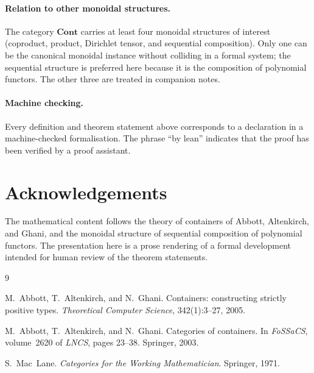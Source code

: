 \documentclass[11pt,a4paper]{article}
\theoremstyle{plain}
\theoremstyle{definition}
\newcommand{\Cont}{\mathbf{Cont}}
\begin{document}
\paragraph{Relation to other monoidal structures.}
The category $\Cont$ carries at least four monoidal structures of
interest (coproduct, product, Dirichlet tensor, and sequential
composition). Only one can be the canonical monoidal instance without
colliding in a formal system; the sequential structure is preferred here
because it is the composition of polynomial functors. The other three are
treated in companion notes.

\paragraph{Machine checking.}
Every definition and theorem statement above corresponds to a declaration
in a machine-checked formalisation. The phrase ``by lean'' indicates that
the proof has been verified by a proof assistant.

\section*{Acknowledgements}

The mathematical content follows the theory of containers of Abbott,
Altenkirch, and Ghani, and the monoidal structure of sequential
composition of polynomial functors. The presentation here is a prose
rendering of a formal development intended for human review of the
theorem statements.

\begin{thebibliography}{9}

M.~Abbott, T.~Altenkirch, and N.~Ghani.
\newblock Containers: constructing strictly positive types.
\newblock \emph{Theoretical Computer Science}, 342(1):3--27, 2005.

M.~Abbott, T.~Altenkirch, and N.~Ghani.
\newblock Categories of containers.
\newblock In \emph{FoSSaCS}, volume~2620 of \emph{LNCS}, pages 23--38.
\newblock Springer, 2003.

S.~Mac~Lane.
\newblock \emph{Categories for the Working Mathematician}.
\newblock Springer, 1971.

\end{thebibliography}
\end{document}
